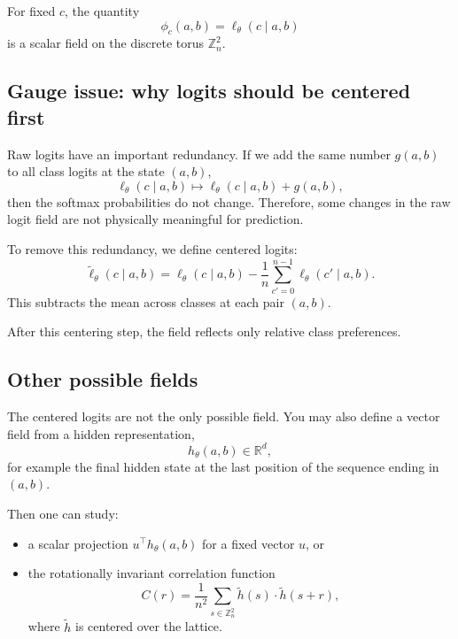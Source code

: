 \documentclass[11pt]{article}
\newcommand{\Zn}{\mathbb{Z}_n}
\newcommand{\R}{\mathbb{R}}
\begin{document}
For fixed $c$, the quantity
\begin{equation}
    \phi_c(a,b) = \ell_\theta(c \mid a,b)
\end{equation}
is a scalar field on the discrete torus $\Zn^2$.

\subsection{Gauge issue: why logits should be centered first}

Raw logits have an important redundancy. If we add the same number $g(a,b)$ to all class logits at the state $(a,b)$,
\begin{equation}
    \ell_\theta(c \mid a,b) \mapsto \ell_\theta(c \mid a,b) + g(a,b),
\end{equation}
then the softmax probabilities do not change. Therefore, some changes in the raw logit field are not physically meaningful for prediction.

To remove this redundancy, we define centered logits:
\begin{equation}
    \widetilde{\ell}_\theta(c \mid a,b)
    = \ell_\theta(c \mid a,b) - \frac{1}{n}\sum_{c'=0}^{n-1} \ell_\theta(c' \mid a,b).
\end{equation}
This subtracts the mean across classes at each pair $(a,b)$.

After this centering step, the field reflects only relative class preferences.

\subsection{Other possible fields}

The centered logits are not the only possible field. You may also define a vector field from a hidden representation,
\begin{equation}
    h_\theta(a,b) \in \R^d,
\end{equation}
for example the final hidden state at the last position of the sequence ending in $(a,b)$.

Then one can study:
\begin{itemize}
    \item a scalar projection $u^\top h_\theta(a,b)$ for a fixed vector $u$, or
    \item the rotationally invariant correlation function
    \begin{equation}
        C(r) = \frac{1}{n^2} \sum_{s \in \Zn^2} \widetilde{h}(s) \cdot \widetilde{h}(s+r),
    \end{equation}
    where $\widetilde{h}$ is centered over the lattice.
\end{itemize}
\end{document}
